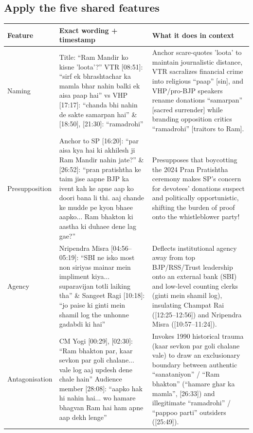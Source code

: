\documentclass[10pt,a4paper]{article}
\begin{document}
\subsection*{Apply the five shared features}
\par\vspace{4pt}
{\small
\begin{longtable}{@{}>{\raggedright\arraybackslash}p{} >{\raggedright\arraybackslash}p{} >{\raggedright\arraybackslash}p{}@{}}
\toprule
\textbf{Feature} & \textbf{Exact wording + timestamp} & \textbf{What it does in context} \\
\midrule
\endhead
Naming & Title: ``Ram Mandir ko kisne 'loota'?'' \newline  VTR [08:51]: ``sirf ek bhrashtachar ka mamla bhar nahin balki ek aisa paap hai'' vs VHP [17:17]: ``chanda bhi nahin de sakte samarpan hai'' \& [18:50], [21:30]: ``ramadrohi'' & Anchor scare-quotes 'loota' to maintain journalistic distance, VTR sacralizes financial crime into religious ``paap'' [sin], and VHP/pro-BJP speakers rename donations ``samarpan'' [sacred surrender] while branding opposition critics ``ramadrohi'' [traitors to Ram]. \\
\addlinespace[6pt]
Presupposition & Anchor to SP [16:20]: ``par aisa kya hai ki akhilesh ji Ram Mandir nahin jate?'' \& [26:52]: ``pran pratishtha ke taim jise aapne BJP ka ivent kah ke apne aap ko doori bana li thi. aaj chande ke mudde pe kyon bhaee aapko... Ram bhakton ki aastha ki duhaee dene lag gae?'' & Presupposes that boycotting the 2024 Pran Pratishtha ceremony makes SP's concern for devotees' donations suspect and politically opportunistic, shifting the burden of proof onto the whistleblower party! \\
\addlinespace[6pt]
Agency & Nripendra Misra [04:56--05:19]: ``SBI ne isko most non siriyas mainar mein impliment kiya... suparavijan totli laiking tha'' \& Sangeet Ragi [10:18]: ``jo paise ki ginti mein shamil log the unhonne gadabdi ki hai'' & Deflects institutional agency away from top BJP/RSS/Trust leadership onto an external bank (SBI) and low-level counting clerks (ginti mein shamil log), insulating Champat Rai ([12:25--12:56]) and Nripendra Misra ([10:57--11:24]). \\
\addlinespace[6pt]
Antagonisation & CM Yogi [00:29], [02:30]: ``Ram bhakton par, kaar sevkon par goli chalane... vale log aaj updesh dene chale hain'' \newline  Audience member [28:08]: ``aapko hak hi nahin hai... wo hamare bhagvan Ram hai ham apne aap dekh lenge'' & Invokes 1990 historical trauma (kaar sevkon par goli chalane vale) to draw an exclusionary boundary between authentic ``sanataniyon'' / ``Ram bhakton'' (``hamare ghar ka mamla'', [26:33]) and illegitimate ``ramadrohi'' / ``pappoo parti'' outsiders ([25:49]). \\

\end{longtable}}
\end{document}
